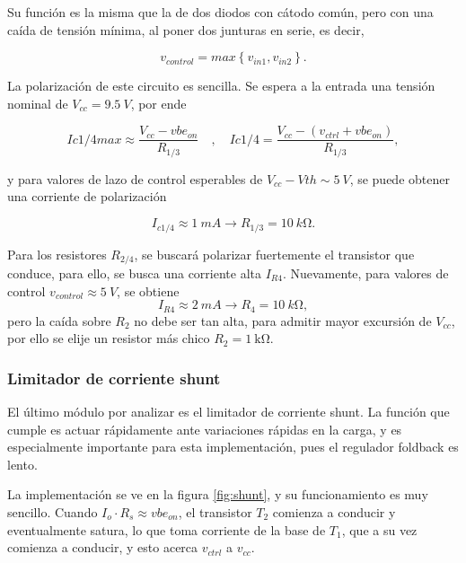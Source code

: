 \documentclass[]{article}
\begin{document}
	Su función es la misma que la de dos diodos con cátodo común, pero con una caída de tensión mínima, al poner dos junturas en serie, es decir,
	
	\begin{equation}
		v_{control} = max\left\{ v_{in1} , v_{in2} \right\}.
	\end{equation}
	
	La polarización de este circuito es sencilla. Se espera a la entrada una tensión nominal de $V_{cc} = \SI{9.5}{V}$, por ende 
	
	\begin{equation}
		I{c1/4 max} \approx \frac{V_{cc}-vbe_{on}}{R_{1/3}} \quad,\quad I{c1/4} = \frac{V_{cc}-(v_{ctrl}+vbe_{on})}{R_{1/3}},
	\end{equation}
	
	y para valores de lazo de control esperables de $ V_{cc}-V{th} \sim \SI{5}{V}$, se puede obtener una corriente de polarización 
	
	\begin{equation}
	I_{c1/4} \approx \SI{1}{mA} \rightarrow R_{1/3} = \SI{10}{k\ohm}.
	\end{equation}
	
	Para los resistores $R_{2/4}$, se buscará polarizar fuertemente el transistor que conduce, para ello, se busca una corriente alta $I_{R4}$. Nuevamente, para valores de control $v_{control} \approx \SI{5}{V}$, se obtiene 
	\begin{equation}
	I_{R4} \approx \SI{2}{mA} \rightarrow R_4 = \SI{10}{k\ohm},
	\end{equation}
	pero la caída sobre $R_2$ no debe ser tan alta, para admitir mayor excursión de $V_{cc}$, por ello se elije un resistor más chico $R_2 = \SI{1}{\kilo\ohm}$.

\FloatBarrier
	\subsubsection{Limitador de corriente shunt}
	\FloatBarrier
	El último módulo por analizar es el limitador de corriente shunt. La función que cumple es actuar rápidamente ante variaciones rápidas en la carga, y es especialmente importante para esta implementación, pues el regulador foldback es lento.
	
	La implementación se ve en la figura \ref{fig:shunt}, y su funcionamiento es muy sencillo. Cuando $I_o \cdot R_s \approx vbe_{on}$, el transistor $T_2$ comienza a conducir y eventualmente satura, lo que toma corriente de la base de $T_1$, que a su vez comienza a conducir, y esto acerca $v_{ctrl}$ a $v_{cc}$.
	
\end{document}
